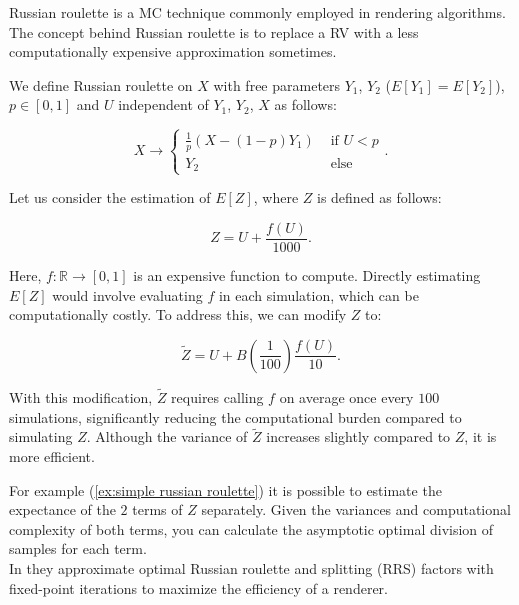 \documentclass[a4paper,12pt]{article}
\begin{document}
Russian roulette is a MC technique commonly employed in rendering algorithms.
The concept behind Russian roulette is to replace a RV with a
less computationally expensive approximation sometimes.

\begin{definition} \label{Russian roulette}
    We define Russian roulette on $X$ with free parameters
    $Y_{1}$, $Y_{2}$ ($E[Y_{1}] = E[Y_{2}]$), $p \in [0,1]$
    and $U$ independent of $Y_{1}$, $Y_{2}$, $X$
    as follows:

    \begin{equation}
        X \rightarrow
        \begin{cases}
            \frac{1}{p}(X - (1-p)Y_{1}) & \text{ if } U < p \\
            Y_{2}                       & \text{ else }
        \end{cases}.
    \end{equation}
\end{definition}

\begin{example} \label{ex:simple russian roulette}
    Let us consider the estimation of $E[Z]$, where $Z$ is defined as follows:

    \begin{equation}
        Z = U + \frac{f(U)}{1000}.
    \end{equation}

    Here, $f:\mathbb{R} \rightarrow [0,1]$ is an expensive function to compute.
    Directly estimating $E[Z]$ would involve evaluating $f$ in each simulation,
    which can be computationally costly. To address this, we can modify $Z$ to:

    \begin{equation}
        \tilde{Z} = U + B\left(\frac{1}{100}\right)\frac{f(U)}{10}.
    \end{equation}

    With this modification, $\tilde{Z}$ requires calling $f$ on
    average once every $100$ simulations, significantly reducing the
    computational burden compared to simulating $Z$. Although the variance of $\tilde{Z}$
    increases slightly compared to $Z$, it is more efficient.

\end{example}

\begin{related}
    For example (\ref{ex:simple russian roulette}) it is possible to estimate
    the expectance of the $2$ terms of $Z$ separately. Given the variances and
    computational complexity of both terms, you can calculate the asymptotic optimal
    division of samples for each term. \\
    In \cite{rath_ears_2022} they approximate optimal Russian roulette and splitting
    (RRS) factors with fixed-point iterations to maximize the efficiency of a renderer.
\end{related}
\end{document}
